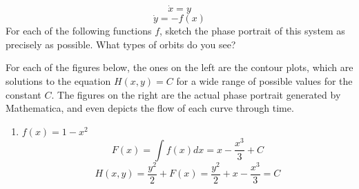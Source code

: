 \documentclass[12pt,letterpaper,reqno]{amsart}
\begin{document}
\begin{enumerate}
\begin{flushleft}
$$\dot{x} = y$$
$$\dot{y} = -f(x)$$
\newline
For each of the following functions $f$, sketch the phase portrait of this system as precisely as possible. What types of orbits do you see?
\newline

For each of the figures below, the ones on the left are the contour plots, which are solutions to the equation $H(x,y) = C$ for a wide range of possible values for the constant $C$. The figures on the right are the actual phase portrait generated by Mathematica, and even depicts the flow of each curve through time.
\newline

\begin{enumerate}
    \item
    \begin{flushleft}
    $f(x) = 1 - x^2$
    \newline
    $$F(x) = \int f(x)dx = x - \frac{x^3}{3} + C$$
    $$H(x,y) = \frac{y^2}{2} + F(x) = \frac{y^2}{2} + x - \frac{x^3}{3} = C$$
    \end{flushleft}
    

\end{enumerate}
\end{flushleft}
\end{enumerate}
\end{document}
